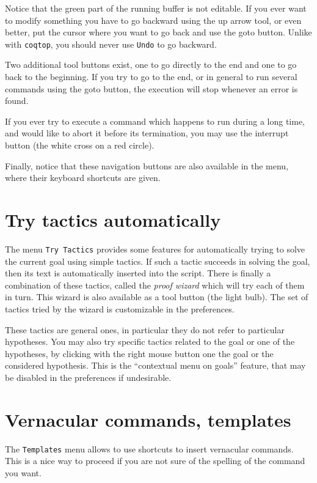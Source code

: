 Notice that the green part of the running buffer is not editable. If
you ever want to modify something you have to go backward using the up
arrow tool, or even better, put the cursor where you want to go back
and use the \textsf{goto} button. Unlike with \verb|coqtop|, you
should never use \verb|Undo| to go backward.

Two additional tool buttons exist, one to go directly to the end and
one to go back to the beginning. If you try to go to the end, or in
general to run several commands using the \textsf{goto} button, the
  execution will stop whenever an error is found.

If you ever try to execute a command which happens to run during a
long time, and would like to abort it before its
termination, you may use the interrupt button (the white cross on a red circle).
 
Finally, notice that these navigation buttons are also available in
the menu, where their keyboard shortcuts are given.

\section{Try tactics automatically}
\label{sec:trytactics}

The menu \texttt{Try Tactics} provides some features for automatically
trying to solve the current goal using simple tactics. If such a
tactic succeeds in solving the goal, then its text is automatically
inserted into the script. There is finally a combination of these
tactics, called the \emph{proof wizard} which will try each of them in
turn. This wizard is also available as a tool button (the light
bulb).  The set of tactics tried by the wizard is customizable in
the preferences.

These tactics are general ones, in particular they do not refer to
particular hypotheses. You may also try specific tactics related to
the goal or one of the hypotheses, by clicking with the right mouse
button one the goal or the considered hypothesis. This is the
``contextual menu on goals'' feature, that may be disabled in the
preferences if undesirable.
 
\section{Vernacular commands, templates}

The \texttt{Templates} menu allows to use shortcuts to insert
vernacular commands. This is a nice way to proceed if you are not sure
of the spelling of the command you want.


